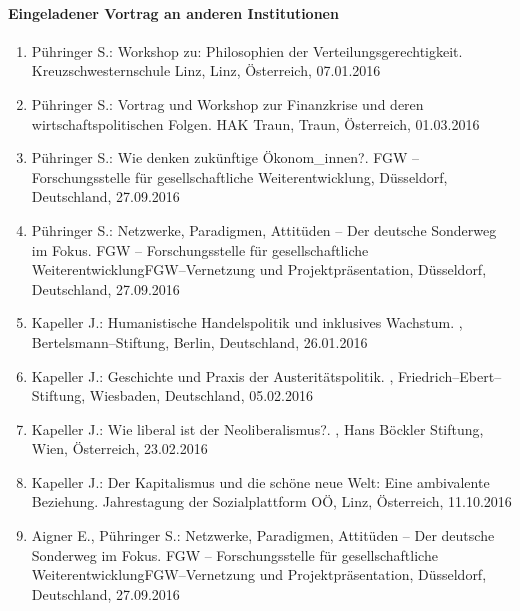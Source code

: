\paragraph{Eingeladener Vortrag an anderen Institutionen}
\begin{enumerate}
	\item Pühringer S.: Workshop zu: Philosophien der Verteilungsgerechtigkeit. Kreuzschwesternschule Linz, Linz, Österreich, 07.01.2016
	\item Pühringer S.: Vortrag und Workshop zur Finanzkrise und deren wirtschaftspolitischen Folgen. HAK Traun, Traun, Österreich, 01.03.2016
	\item Pühringer S.: Wie denken zukünftige Ökonom\_innen?. FGW -- Forschungsstelle für gesellschaftliche Weiterentwicklung, Düsseldorf, Deutschland, 27.09.2016
	\item Pühringer S.: Netzwerke, Paradigmen, Attitüden -- Der deutsche Sonderweg im Fokus. FGW -- Forschungsstelle für gesellschaftliche WeiterentwicklungFGW--Vernetzung und Projektpräsentation, Düsseldorf, Deutschland, 27.09.2016
	\item Kapeller J.: Humanistische Handelspolitik und inklusives Wachstum. , Bertelsmann--Stiftung, Berlin, Deutschland, 26.01.2016
	\item Kapeller J.: Geschichte und Praxis der Austeritätspolitik. , Friedrich--Ebert--Stiftung, Wiesbaden, Deutschland, 05.02.2016
	\item Kapeller J.: Wie liberal ist der Neoliberalismus?. , Hans Böckler Stiftung, Wien, Österreich, 23.02.2016
	\item Kapeller J.: Der Kapitalismus und die schöne neue Welt: Eine ambivalente Beziehung. Jahrestagung der Sozialplattform OÖ, Linz, Österreich, 11.10.2016
	\item Aigner E., Pühringer S.: Netzwerke, Paradigmen, Attitüden -- Der deutsche Sonderweg im Fokus. FGW -- Forschungsstelle für gesellschaftliche WeiterentwicklungFGW--Vernetzung und Projektpräsentation, Düsseldorf, Deutschland, 27.09.2016
\end{enumerate}
